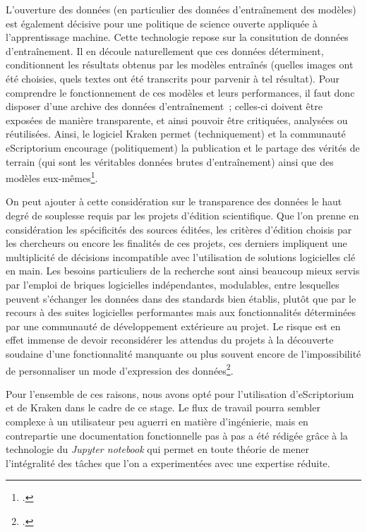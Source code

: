 \documentclass[a4paper,12pt,twoside]{book}
\begin{document}
			L'ouverture des données (en particulier des données d'entraînement des modèles) est également décisive pour une politique de science ouverte appliquée à l'apprentissage machine. Cette technologie repose sur la consitution de données d'entraînement. Il en découle naturellement que ces données déterminent, conditionnent les résultats obtenus par les modèles entraînés (quelles images ont été choisies, quels textes ont été transcrits pour parvenir à tel résultat). Pour comprendre le fonctionnement de ces modèles et leurs performances, il faut donc disposer d'une archive des données d'entraînement~; celles-ci doivent être exposées de manière transparente, et ainsi pouvoir être critiquées, analysées ou réutilisées. Ainsi, le logiciel Kraken permet (techniquement) et la communauté eScriptorium encourage (politiquement) la publication et le partage des vérités de terrain (qui sont les véritables données brutes d'entraînement) ainsi que des modèles eux-mêmes\footcite{chagueHTRUnitedMutualisonsVerite2021}.
			
			On peut ajouter à cette considération sur le transparence des données le haut degré de souplesse requis par les projets d'édition scientifique. Que l'on prenne en considération les spécificités des sources éditées, les critères d'édition choisis par les chercheurs ou encore les finalités de ces projets, ces derniers impliquent une multiplicité de décisions incompatible avec l'utilisation de solutions logicielles clé en main. Les besoins particuliers de la recherche sont ainsi beaucoup mieux servis par l'emploi de briques logicielles indépendantes, modulables, entre lesquelles peuvent s'échanger les données dans des standards bien établis, plutôt que par le recours à des suites logicielles performantes mais aux fonctionnalités déterminées par une communauté de développement extérieure au projet. Le risque est en effet immense de devoir reconsidérer les attendus du projets à la découverte soudaine d'une fonctionnalité manquante ou plus souvent encore de l'impossibilité de personnaliser un mode d'expression des données\footcite{stokesEScriptoriumVREManuscript2021}.
			
			Pour l'ensemble de ces raisons, nous avons opté pour l'utilisation d'eScriptorium et de Kraken dans le cadre de ce stage. Le flux de travail pourra sembler complexe à un utilisateur peu aguerri en matière d'ingénierie, mais en contrepartie une documentation fonctionnelle pas à pas a été rédigée grâce à la technologie du \textit{Jupyter notebook} qui permet en toute théorie de mener l'intégralité des tâches que l'on a experimentées avec une expertise réduite.
						
\end{document}

